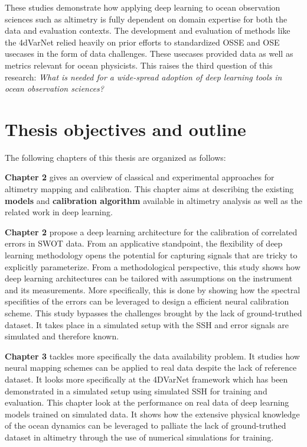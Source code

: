 \begin{bibunit}
These studies demonstrate how applying deep learning to ocean observation sciences such as altimetry is fully dependent on domain expertise for both the data and evaluation contexts.
The development and evaluation of methods like the 4dVarNet relied heavily on prior efforts to standardized OSSE and OSE usecases in the form of data challenges\cite{}. These usecases provided data as well as metrics relevant for ocean physicists. 
This raises the third question of this research: \textit{What is needed for a wide-spread adoption of deep learning tools  in ocean observation sciences?}




\section{Thesis objectives and outline}

The following chapters of this thesis are organized as follows:

\textbf{Chapter 2} gives an overview of classical and experimental approaches for altimetry mapping and calibration. This chapter aims at describing the existing \textbf{models} and \textbf{calibration algorithm} available in altimetry analysis as well as the related work in deep learning.

\textbf{Chapter 2} propose a deep learning architecture for the calibration of correlated errors in SWOT data.
From an applicative standpoint, the flexibility of deep learning methodology opens the potential for capturing signals that are tricky to explicitly parameterize.
From a methodological perspective, this study shows how deep learning architectures can be tailored with assumptions on the instrument and its measurements.
More specifically, this is done by showing how the spectral specifities of the errors can be leveraged to design a efficient neural calibration scheme.
This study bypasses the challenges brought by the lack of ground-truthed dataset.
It takes place in a simulated setup with the SSH and error signals are simulated and therefore known.


\textbf{Chapter 3} tackles more specifically the data availability problem. It studies how neural mapping schemes can be applied to real data despite the lack of reference dataset.
It looks more specifically at the 4DVarNet\cite{} framework which has been demonstrated in a simulated setup\cite{} using simulated SSH for training and evaluation.
This chapter look at the performance on real data of deep learning models trained on simulated data.
It shows how the extensive physical knowledge of the ocean dynamics can be leveraged to palliate the lack of ground-truthed dataset in altimetry through the use of numerical simulations for training.


\end{bibunit}
